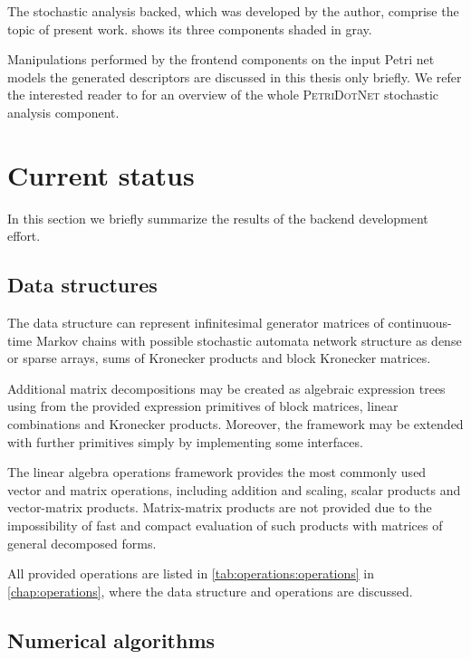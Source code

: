 The stochastic analysis backed, which was developed by the author,
comprise the topic of present work.  shows
its three components shaded in gray.

Manipulations performed by the frontend components on the input Petri
net models the generated descriptors are discussed in this thesis only
briefly. We refer the interested reader to
\cite{TDK2015_Klenik_Marussy} for an overview of the whole
\textsc{PetriDotNet} stochastic analysis component.

\section{Current status}

In this section we briefly summarize the results of the backend
development effort.

\subsection{Data structures}

The data structure can represent infinitesimal generator matrices of
continuous-time Markov chains with possible stochastic automata
network structure as dense or sparse arrays, sums of Kronecker
products and block Kronecker matrices.

Additional matrix decompositions may be created as algebraic
expression trees using from the provided expression primitives of
block matrices, linear combinations and Kronecker products. Moreover,
the framework may be extended with further primitives simply by
implementing some interfaces.

The linear algebra operations framework provides the most commonly
used vector and matrix operations, including addition and scaling,
scalar products and vector-matrix products. Matrix-matrix products are
not provided due to the impossibility of fast and compact evaluation
of such products with matrices of general decomposed forms.

All provided operations are listed in \vref{tab:operations:operations}
in \cref{chap:operations}, where the data structure and operations are
discussed.

\subsection{Numerical algorithms}


